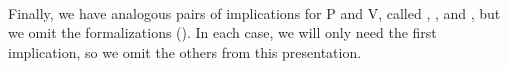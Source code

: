 \begin{code}%
\>[0]\<%
\\
\>[0][@{}l@{\AgdaIndent{1}}]%
\>[1]\AgdaSpace{}%
\AgdaSymbol{:}\AgdaSpace{}%
\AgdaSpace{}%
\AgdaSpace{}%
\AgdaSpace{}%
\AgdaSpace{}%
\AgdaSpace{}%
\AgdaSpace{}%
\AgdaSymbol{\{}\AgdaSpace{}%
\AgdaSymbol{=}\AgdaSpace{}%
\AgdaSymbol{\}\{}\AgdaSymbol{\}}\AgdaSpace{}%
\AgdaSpace{}%
\AgdaSpace{}%
\AgdaSpace{}%
\AgdaSpace{}%
\<%
\\
%
\>[1]\AgdaSpace{}%
\AgdaSpace{}%
\AgdaSpace{}%
\AgdaSymbol{(}\AgdaSpace{}%
\AgdaOperator{\AgdaInductiveConstructor{,}}\AgdaSpace{}%
\AgdaSpace{}%
\AgdaOperator{\AgdaInductiveConstructor{,}}\AgdaSpace{}%
\AgdaSymbol{)}\AgdaSpace{}%
\AgdaSymbol{=}\AgdaSpace{}%
\AgdaSymbol{\{}\AgdaSpace{}%
\AgdaSymbol{=}\AgdaSpace{}%
\AgdaSymbol{\}\{}\AgdaSymbol{\}}\AgdaSpace{}%
\AgdaSymbol{(}\AgdaSpace{}%
\AgdaSpace{}%
\AgdaSymbol{)}\AgdaSpace{}%
\<%
\\
%
\\[\AgdaEmptyExtraSkip]%
%
\>[1]\AgdaSpace{}%
\AgdaSymbol{:}\AgdaSpace{}%
\AgdaSpace{}%
\AgdaSpace{}%
\AgdaSpace{}%
\AgdaSpace{}%
\AgdaSpace{}%
\AgdaSpace{}%
\AgdaSpace{}%
\AgdaSpace{}%
\AgdaSpace{}%
\AgdaSpace{}%
\AgdaSpace{}%
\AgdaSpace{}%
\<%
\\
%
\>[1]\AgdaSpace{}%
\AgdaSpace{}%
\AgdaSpace{}%
\AgdaSpace{}%
\AgdaSymbol{=}\AgdaSpace{}%
\AgdaSpace{}%
\AgdaSpace{}%
\AgdaSymbol{(}\AgdaSpace{}%
\AgdaOperator{\AgdaInductiveConstructor{,}}\AgdaSpace{}%
\AgdaSymbol{(}\AgdaSpace{}%
\AgdaOperator{\AgdaInductiveConstructor{,}}\AgdaSpace{}%
\AgdaSymbol{))}\<%
\\
\>[0]\<%
\end{code}
Finally, we have analogous pairs of implications for \af P and \af V,
\ifshort
  called , ,  and , but we omit the formalizations (\seeshort).
\else
In each case, we will only need the first implication, so we omit the others from this presentation.


